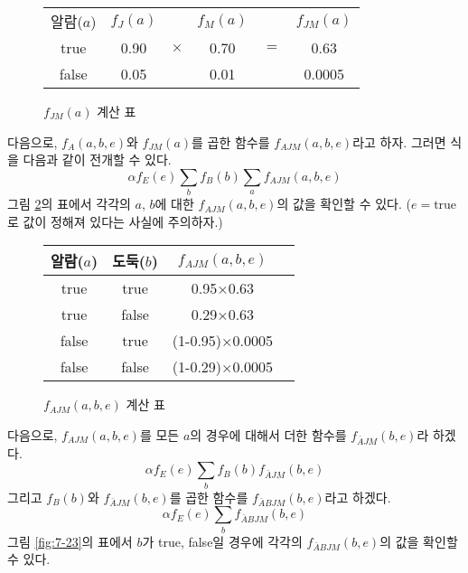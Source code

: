 \documentclass[a4paper]{oblivoir}
\begin{document}
\begin{figure}[ht] \centering 
\begin{tabular}{|c|c|c|c|c|c|}
  \hline
  알람($a$) & $f_{J}(a)$ &  & $f_{M}(a)$ &  & $f_{JM}(a)$   \\
  \cline{1-2} \cline{4-4} \cline{6-6}
  true & 0.90 & $\times$ & 0.70 & $=$ & 0.63 \\
  \cline{1-2} \cline{4-4} \cline{6-6}
  false & 0.05 &  & 0.01 &  & 0.0005\\
  \hline
\end{tabular}
\caption{$f_{JM}(a)$ 계산 표}
\label{fig:7-19}
\end{figure} 
다음으로, $f_{A}(a,b,e)$와 $f_{JM}(a)$를 곱한 함수를 $f_{AJM}(a,b,e)$라고 하자. 그러면 식을 다음과 같이 전개할 수 있다.
\begin{equation}
\alpha f_{E}(e) \sum_{b} f_{B}(b) \sum_{a} f_{AJM}(a,b,e)
\label{eq:7-25}
\end{equation}
그림 \ref{fig:7-21}의 표에서 각각의 $a$, $b$에 대한 $f_{AJM}(a,b,e)$의 값을 확인할 수 있다. ($e=\textrm{true}$로 값이 정해져 있다는 사실에 주의하자.) 

\begin{figure}[ht] \centering 
\begin{tabular}{|c|c|c|c|}
  \hline
  알람($a$) & 도둑($b$) & $f_{AJM}(a,b,e)$\\
  \hline
  true & true & 0.95$\times$0.63 \\
  \hline
  true & false & 0.29$\times$0.63 \\
  \hline
  false & true & (1-0.95)$\times$0.0005 \\
  \hline
  false & false & (1-0.29)$\times$0.0005 \\
  \hline
\end{tabular}
\caption{$f_{AJM}(a,b,e)$ 계산 표}
\label{fig:7-21}
\end{figure} 
\noindent 다음으로, $f_{AJM}(a,b,e)$를 모든 $a$의 경우에 대해서 더한 함수를 $f_{\bar{A}JM}(b,e)$라 하겠다.
\begin{equation}
\alpha f_{E}(e) \sum_{b} f_{B}(b) f_{\bar{A}JM}(b,e)
\label{eq:7-26}
\end{equation}
그리고 $f_{B}(b)$와 $f_{\bar{A}JM}(b,e)$를 곱한 함수를 $f_{\bar{A}BJM}(b,e)$라고 하겠다.
\begin{equation}
\alpha f_{E}(e) \sum_{b}  f_{\bar{A}BJM}(b,e)
\label{eq:7-27}
\end{equation}
그림 \ref{fig:7-23}의 표에서 $b$가 true, false일 경우에 각각의 $f_{\bar{A}BJM}(b,e)$의 값을 확인할 수 있다.
\end{document}
